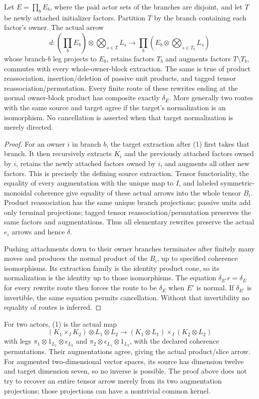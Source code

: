 \documentclass[11pt]{article}
\begin{document}
\begin{theorem}
Let $E=\prod_bE_b$, where the paid actor sets of the branches are disjoint, and let $T$ be newly attached initializer factors. Partition $T$ by the branch containing each factor's owner. The actual arrow
\[
 d:(\prod_bE_b)\otimes\bigotimes_{s\in T}L_s
 \longrightarrow\prod_b\left(E_b\otimes\bigotimes_{s\in T_b}L_s\right)       \tag{1}
\]
whose branch-$b$ leg projects to $E_b$, retains factors $T_b$ and augments factors $T\setminus T_b$, commutes with every whole-owner-block extraction. The same is true of product reassociation, insertion/deletion of passive unit products, and tagged tensor reassociation/permutation. Every finite route of these rewrites ending at the normal owner-block product has composite exactly $\delta_E$. More generally two routes with the same source and target agree if the target's normalization is an isomorphism. No cancellation is asserted when that target normalization is merely directed.
\end{theorem}
\begin{proof}
For an owner $i$ in branch $b$, the target extraction after (1) first takes that branch. It then recursively extracts $K_i$ and the previously attached factors owned by $i$, retains the newly attached factors owned by $i$, and augments all other new factors. This is precisely the defining source extraction. Tensor functoriality, the equality of every augmentation with the unique map to $I$, and labeled symmetric-monoidal coherence give equality of these actual arrows into the whole tensor $B_i$. Product reassociation has the same unique branch projections; passive units add only terminal projections; tagged tensor reassociation/permutation preserves the same factors and augmentations. Thus all elementary rewrites preserve the actual $e_i$ arrows and hence $\delta$.

Pushing attachments down to their owner branches terminates after finitely many moves and produces the normal product of the $B_i$, up to specified coherence isomorphisms. Its extraction family is the identity product cone, so its normalization is the identity up to those isomorphisms. The equation $\delta_{E'}r=\delta_E$ for every rewrite route then forces the route to be $\delta_E$ when $E'$ is normal. If $\delta_{E'}$ is invertible, the same equation permits cancellation. Without that invertibility no equality of routes is inferred.\end{proof}

For two actors, (1) is the actual map
\[
 (K_1\times_I K_2)\otimes L_1\otimes L_2
 \longrightarrow (K_1\otimes L_1)\times_I(K_2\otimes L_2)
\]
with legs $\pi_1\otimes1_{L_1}\otimes\epsilon_{L_2}$ and $\pi_2\otimes\epsilon_{L_1}\otimes1_{L_2}$, with the declared coherence permutations. Their augmentations agree, giving the actual product/slice arrow. For augmented two-dimensional vector spaces, its source has dimension twelve and target dimension seven, so no inverse is possible. The proof above does not try to recover an entire tensor arrow merely from its two augmentation projections; those projections can have a nontrivial common kernel.
\end{document}
